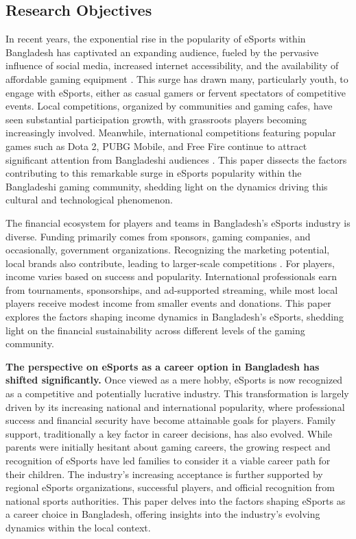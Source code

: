 \documentclass[manuscript,screen,review,anonymous]{acmart}
\begin{document}
\subsection{Research Objectives}
In recent years, the exponential rise in the popularity of eSports within Bangladesh has captivated an expanding audience, fueled by the pervasive influence of social media, increased internet accessibility, and the availability of affordable gaming equipment \cite{Wattanapisit2020Public}. This surge has drawn many, particularly youth, to engage with eSports, either as casual gamers or fervent spectators of competitive events. Local competitions, organized by communities and gaming cafes, have seen substantial participation growth, with grassroots players becoming increasingly involved. Meanwhile, international competitions featuring popular games such as Dota 2, PUBG Mobile, and Free Fire continue to attract significant attention from Bangladeshi audiences \cite{Kemp2020Brace}. This paper dissects the factors contributing to this remarkable surge in eSports popularity within the Bangladeshi gaming community, shedding light on the dynamics driving this cultural and technological phenomenon.

The financial ecosystem for players and teams in Bangladesh’s eSports industry is diverse. Funding primarily comes from sponsors, gaming companies, and occasionally, government organizations. Recognizing the marketing potential, local brands also contribute, leading to larger-scale competitions \cite{Funk2017eSport}. For players, income varies based on success and popularity. International professionals earn from tournaments, sponsorships, and ad-supported streaming, while most local players receive modest income from smaller events and donations. This paper explores the factors shaping income dynamics in Bangladesh’s eSports, shedding light on the financial sustainability across different levels of the gaming community.

\textbf{The perspective on eSports as a career option in Bangladesh has shifted significantly.} Once viewed as a mere hobby, eSports is now recognized as a competitive and potentially lucrative industry. This transformation is largely driven by its increasing national and international popularity, where professional success and financial security have become attainable goals for players. Family support, traditionally a key factor in career decisions, has also evolved. While parents were initially hesitant about gaming careers, the growing respect and recognition of eSports have led families to consider it a viable career path for their children. The industry's increasing acceptance is further supported by regional eSports organizations, successful players, and official recognition from national sports authorities. This paper delves into the factors shaping eSports as a career choice in Bangladesh, offering insights into the industry's evolving dynamics within the local context.
\end{document}
